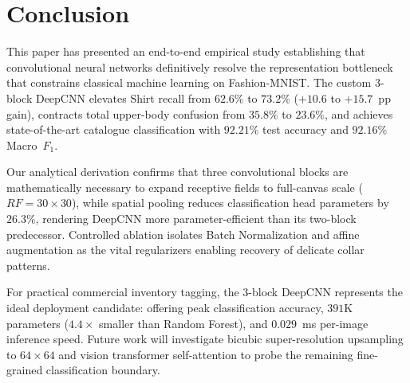 \documentclass[conference]{IEEEtran}
\begin{document}
\section{Conclusion}\label{sec:conclusion}

This paper has presented an end-to-end empirical study establishing that convolutional neural networks definitively resolve the representation bottleneck that constrains classical machine learning on Fashion-MNIST. The custom 3-block DeepCNN elevates Shirt recall from $62.6\%$ to $73.2\%$ ($+10.6$ to $+15.7$~pp gain), contracts total upper-body confusion from $35.8\%$ to $23.6\%$, and achieves state-of-the-art catalogue classification with $92.21\%$ test accuracy and $92.16\%$ Macro~$F_1$.

Our analytical derivation confirms that three convolutional blocks are mathematically necessary to expand receptive fields to full-canvas scale ($RF = 30 \times 30$), while spatial pooling reduces classification head parameters by $26.3\%$, rendering DeepCNN more parameter-efficient than its two-block predecessor. Controlled ablation isolates Batch Normalization and affine augmentation as the vital regularizers enabling recovery of delicate collar patterns.

For practical commercial inventory tagging, the 3-block DeepCNN represents the ideal deployment candidate: offering peak classification accuracy, $391\text{K}$ parameters ($4.4\times$ smaller than Random Forest), and $0.029$~ms per-image inference speed. Future work will investigate bicubic super-resolution upsampling to $64\times64$ and vision transformer self-attention to probe the remaining fine-grained classification boundary.
\end{document}
